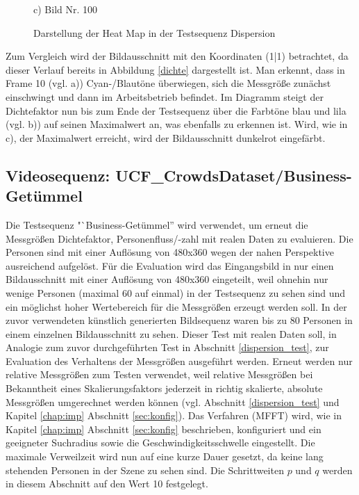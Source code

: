 \begin{figure}[H]
\begin{minipage}{0.3\textwidth}
    c) Bild Nr. 100
  \end{minipage}
\caption{Darstellung der Heat Map in der Testsequenz Dispersion  \cite{CourtyPRL2014} \cite{Allain2012ICPR}}
\label{heatmap_series}
\end{figure}

Zum Vergleich wird der Bildausschnitt mit den Koordinaten (1|1) betrachtet, da dieser Verlauf bereits in Abbildung \ref{dichte} dargestellt ist. Man erkennt, dass in Frame 10 (vgl. a)) Cyan-/Blautöne überwiegen, sich die Messgröße zunächst einschwingt und dann im Arbeitsbetrieb befindet. Im Diagramm steigt der Dichtefaktor nun bis zum Ende der Testsequenz über die Farbtöne blau und lila (vgl. b)) auf seinen Maximalwert an, was ebenfalls zu erkennen ist. Wird, wie in c), der Maximalwert erreicht, wird der Bildausschnitt dunkelrot eingefärbt.

\subsection{Videosequenz: UCF\_CrowdsDataset/Business-Getümmel \cite{AliS07}}
Die Testsequenz "`Business-Getümmel'' wird verwendet, um erneut die Messgrößen Dichtefaktor, Personenfluss/-zahl mit realen Daten zu evaluieren. Die Personen sind mit einer Auflösung von 480x360 wegen der nahen Perspektive ausreichend aufgelöst. Für die Evaluation wird das Eingangsbild in nur einen Bildausschnitt mit einer Auflösung von 480x360 eingeteilt, weil ohnehin nur wenige Personen (maximal 60 auf einmal) in der Testsequenz zu sehen sind und ein möglichst hoher Wertebereich für die Messgrößen erzeugt werden soll. In der zuvor verwendeten künstlich generierten Bildsequenz waren bis zu 80 Personen in einem einzelnen Bildausschnitt zu sehen. Dieser Test mit realen Daten soll, in Analogie zum zuvor durchgeführten Test in Abschnitt \ref{dispersion_test}, zur Evaluation des Verhaltens der Messgrößen ausgeführt werden. Erneut werden nur relative Messgrößen zum Testen verwendet, weil relative Messgrößen bei Bekanntheit eines Skalierungsfaktors jederzeit in richtig skalierte, absolute Messgrößen umgerechnet werden können (vgl. Abschnitt \ref{dispersion_test} und Kapitel \ref{chap:imp} Abschnitt \ref{sec:konfig}). Das Verfahren (MFFT) wird, wie in Kapitel \ref{chap:imp} Abschnitt \ref{sec:konfig} beschrieben, konfiguriert und ein geeigneter Suchradius sowie die Geschwindigkeitsschwelle eingestellt. Die maximale Verweilzeit wird nun auf eine kurze Dauer gesetzt, da keine lang stehenden Personen in der Szene zu sehen sind. Die Schrittweiten $p$ und $q$ werden in diesem Abschnitt auf den Wert 10 festgelegt.


